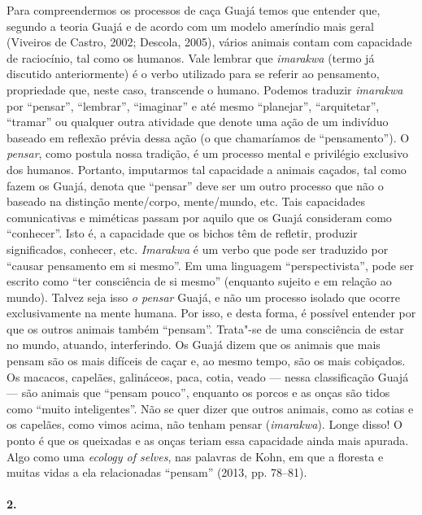 Para compreendermos os processos de caça Guajá temos que entender que,
segundo a teoria Guajá e de acordo com um modelo ameríndio mais geral
(Viveiros de Castro, 2002; Descola, 2005), vários animais contam com
capacidade de raciocínio, tal como os humanos. Vale lembrar que
\emph{imarakwa} (termo já discutido anteriormente) é o verbo utilizado
para se referir ao pensamento, propriedade que, neste caso, transcende o
humano. Podemos traduzir \emph{imarakwa} por ``pensar'', ``lembrar'',
``imaginar'' e até mesmo ``planejar'', ``arquitetar'', ``tramar'' ou qualquer
outra atividade que denote uma ação de um indivíduo baseado em reflexão
prévia dessa ação (o que chamaríamos de ``pensamento''). O \emph{pensar},
como postula nossa tradição, é um processo mental e privilégio exclusivo
dos humanos. Portanto, imputarmos tal capacidade a animais caçados, tal
como fazem os Guajá, denota que ``pensar'' deve ser um outro processo que
não o baseado na distinção mente/corpo, mente/mundo, etc. Tais
capacidades comunicativas e miméticas passam por aquilo que os Guajá
consideram como ``conhecer''. Isto é, a capacidade que os bichos têm de
refletir, produzir significados, conhecer, etc. \emph{Imarakwa} é um
verbo que pode ser traduzido por ``causar pensamento em si mesmo''. Em uma
linguagem ``perspectivista'', pode ser escrito como ``ter consciência de
si mesmo'' (enquanto sujeito e em relação ao mundo). Talvez seja isso
\emph{o pensar} Guajá, e não um processo isolado que ocorre
exclusivamente na mente humana. Por isso, e desta forma, é possível
entender por que os outros animais também ``pensam''. Trata"-se de uma
consciência de estar no mundo, atuando, interferindo. Os Guajá dizem que
os animais que mais pensam são os mais difíceis de caçar e, ao mesmo
tempo, são os mais cobiçados. Os macacos, capelães, galináceos, paca,
cotia, veado --- nessa classificação Guajá --- são animais que ``pensam
pouco'', enquanto os porcos e as onças são tidos como ``muito
inteligentes''. Não se quer dizer que outros animais, como as cotias e os
capelães, como vimos acima, não tenham pensar (\emph{imarakwa}). Longe
disso! O ponto é que os queixadas e as onças teriam essa capacidade
ainda mais apurada. Algo como uma \emph{ecology of selves}, nas palavras
de Kohn, em que a floresta e muitas vidas a ela relacionadas ``pensam''
(2013, pp. 78--81).

\paragraph{2.}

